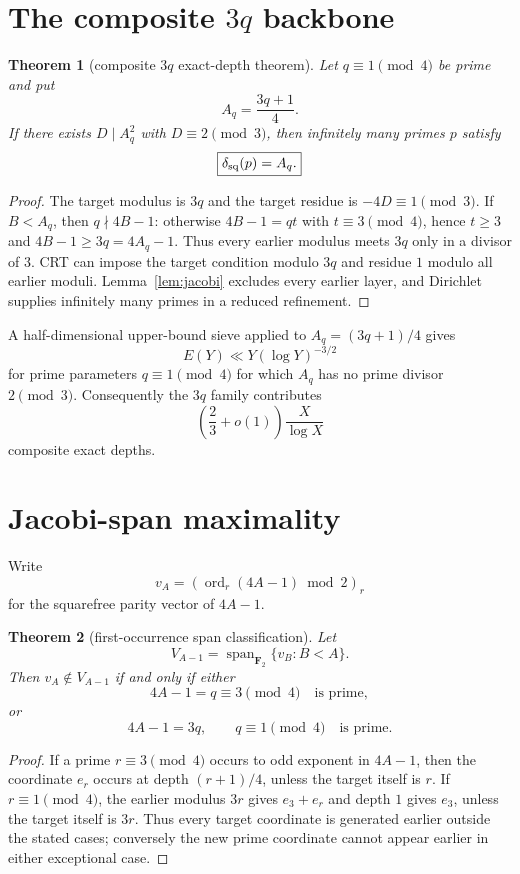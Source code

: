 \documentclass[11pt]{article}
\newtheorem{theorem}{Theorem}
\theoremstyle{definition}
\newcommand{\sqdepth}{\delta_{\rm sq}}
\begin{document}
\section{The composite $3q$ backbone}
\begin{theorem}[composite $3q$ exact-depth theorem]\label{thm:3q}
Let $q\equiv1\pmod4$ be prime and put
\[
A_q=\frac{3q+1}{4}.
\]
If there exists $D\mid A_q^2$ with $D\equiv2\pmod3$, then infinitely many primes $p$ satisfy
\[
\boxed{\sqdepth(p)=A_q.}
\]
\end{theorem}

\begin{proof}
The target modulus is $3q$ and the target residue is $-4D\equiv1\pmod3$. If $B<A_q$, then $q\nmid4B-1$: otherwise $4B-1=qt$ with $t\equiv3\pmod4$, hence $t\ge3$ and $4B-1\ge3q=4A_q-1$. Thus every earlier modulus meets $3q$ only in a divisor of $3$. CRT can impose the target condition modulo $3q$ and residue $1$ modulo all earlier moduli. Lemma~\ref{lem:jacobi} excludes every earlier layer, and Dirichlet supplies infinitely many primes in a reduced refinement.
\end{proof}

A half-dimensional upper-bound sieve applied to $A_q=(3q+1)/4$ gives
\[
E(Y)\ll Y(\log Y)^{-3/2}
\]
for prime parameters $q\equiv1\pmod4$ for which $A_q$ has no prime divisor $2\pmod3$. Consequently the $3q$ family contributes
\[
\left(\frac23+o(1)\right)\frac{X}{\log X}
\]
composite exact depths.

\section{Jacobi-span maximality}
Write
\[
v_A=(\operatorname{ord}_r(4A-1)\bmod2)_r
\]
for the squarefree parity vector of $4A-1$.

\begin{theorem}[first-occurrence span classification]\label{thm:span}
Let
\[
V_{A-1}=\operatorname{span}_{\mathbf F_2}\{v_B:B<A\}.
\]
Then $v_A\notin V_{A-1}$ if and only if either
\[
4A-1=q\equiv3\pmod4\quad\text{is prime},
\]
or
\[
4A-1=3q,
\qquad q\equiv1\pmod4\quad\text{is prime}.
\]
\end{theorem}

\begin{proof}
If a prime $r\equiv3\pmod4$ occurs to odd exponent in $4A-1$, then the coordinate $e_r$ occurs at depth $(r+1)/4$, unless the target itself is $r$. If $r\equiv1\pmod4$, the earlier modulus $3r$ gives $e_3+e_r$ and depth $1$ gives $e_3$, unless the target itself is $3r$. Thus every target coordinate is generated earlier outside the stated cases; conversely the new prime coordinate cannot appear earlier in either exceptional case.
\end{proof}
\end{document}
